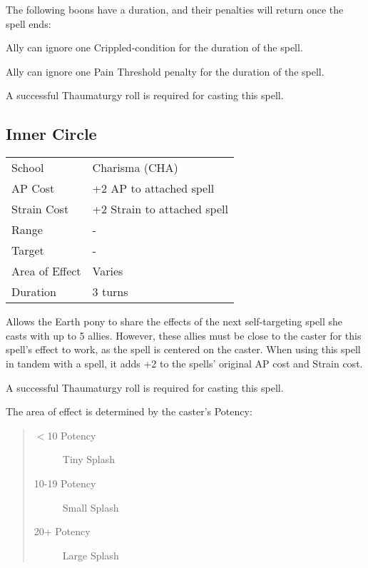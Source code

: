 \documentclass[11pt,a4paper,twocolumn]{book}
\begin{document}
The following boons have a duration, and their penalties will return once the spell ends:

\medskip
\begin{compactitem}
	\item Ally can ignore one Crippled-condition for the duration of the spell.
	\item Ally can ignore one Pain Threshold penalty for the duration of the spell.
\end{compactitem}
\medskip

A successful Thaumaturgy roll is required for casting this spell.


\subsection*{Inner Circle}
{
	\begin{tabu} to 75mm{| X[l,4] | X[l,7] |}
		\hline
		School 			& Charisma (CHA) 	\\
		AP Cost	      	& +2 AP to attached spell 				\\
		Strain Cost     & +2 Strain to attached spell 			\\
		Range     		& - 				\\
		Target      	& - 				\\
		Area of Effect  & Varies 	\\
		Duration     	& 3 turns 			\\ \hline
	\end{tabu}
	
}

\medskip

Allows the Earth pony to share the effects of the next self-targeting spell she casts with up to 5 allies. However, these allies must be close to the caster for this spell's effect to work, as the spell is centered on the caster. When using this spell in tandem with a spell, it adds +2 to the spells' original AP cost and Strain cost.

A successful Thaumaturgy roll is required for casting this spell.

The area of effect is determined by the caster's Potency:
\begin{quote}
	\begin{description}
		\item[$<$10 Potency] 	Tiny Splash 
		\item[10-19 Potency] 	Small Splash 
		\item[20+ Potency]  	Large Splash 
	\end{description}
\end{quote}
\end{document}
